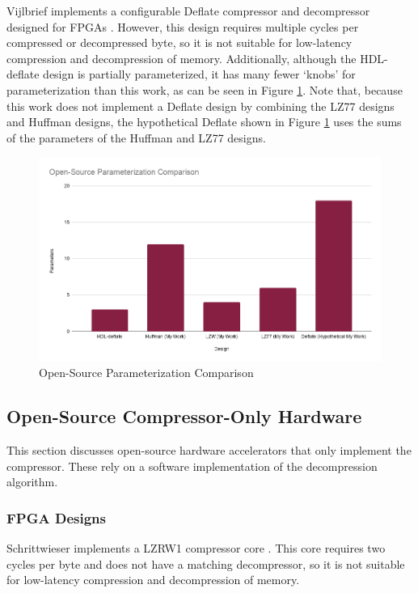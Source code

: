 \documentclass[doublespace,nopageskip]{VTthesis}
\begin{document}
Vijlbrief implements a configurable Deflate compressor and decompressor designed for FPGAs \cite{hdldeflate}. However, this design requires multiple cycles per compressed or decompressed byte, so it is not suitable for low-latency compression and decompression of memory. Additionally, although the HDL-deflate design is partially parameterized, it has many fewer `knobs' for parameterization than this work, as can be seen in Figure \ref{fig:open-source_parameterization_comparison}. Note that, because this work does not implement a Deflate design by combining the LZ77 designs and Huffman designs, the hypothetical Deflate shown in Figure \ref{fig:open-source_parameterization_comparison} uses the sums of the parameters of the Huffman and LZ77 designs.

\begin{figure}[htb]
	\centering
	\includegraphics[scale=0.44]{Open-Source Parameterization Comparison.png}
	\caption{Open-Source Parameterization Comparison}
	\label{fig:open-source_parameterization_comparison}
\end{figure}

\subsection{Open-Source Compressor-Only Hardware}\label{ss:open-source_compressor-only_hardware}
This section discusses open-source hardware accelerators that only implement the compressor. These rely on a software implementation of the decompression algorithm.
\subsubsection{FPGA Designs}\label{sss:open_fpga_compressor_designs}
Schrittwieser implements a LZRW1 compressor core \cite{lzrw1}. This core requires two cycles per byte and does not have a matching decompressor, so it is not suitable for low-latency compression and decompression of memory.
\end{document}

